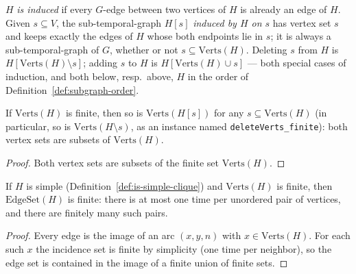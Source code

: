 \begin{definition}
  \label{def:subgraph-induce-delete-add}
  \leanok
  $H$ \emph{is induced} if every $G$-edge between two vertices of $H$ is
  already an edge of $H$. Given $s \subseteq V$, the sub-temporal-graph
  $H[s]$ \emph{induced by $H$ on $s$} has vertex set $s$ and keeps exactly
  the edges of $H$ whose both endpoints lie in $s$; it is always a
  sub-temporal-graph of $G$, whether or not $s \subseteq \mathrm{Verts}(H)$.
  Deleting $s$ from $H$ is $H[\mathrm{Verts}(H) \setminus s]$; adding $s$ to
  $H$ is $H[\mathrm{Verts}(H) \cup s]$ — both special cases of induction,
  and both below, resp.\ above, $H$ in the order of
  Definition~\ref{def:subgraph-order}.
\end{definition}

\begin{lemma}
  \label{lem:subgraph-finite-induce-delete}
  \leanok
  If $\mathrm{Verts}(H)$ is finite, then so is $\mathrm{Verts}(H[s])$ for
  any $s \subseteq \mathrm{Verts}(H)$ (in particular, so is
  $\mathrm{Verts}(H \setminus s)$, as an instance named
  \texttt{deleteVerts\_finite}): both vertex sets are subsets of
  $\mathrm{Verts}(H)$.
\end{lemma}

\begin{proof}
  \leanok
  Both vertex sets are subsets of the finite set $\mathrm{Verts}(H)$.
\end{proof}

\begin{lemma}
  \label{lem:subgraph-finite-edgeSet-of-simple}
  \leanok
  If $H$ is simple (Definition~\ref{def:is-simple-clique}) and
  $\mathrm{Verts}(H)$ is finite, then $\mathrm{EdgeSet}(H)$ is finite: there is
  at most one time per unordered pair of vertices, and there are finitely
  many such pairs.
\end{lemma}

\begin{proof}
  \leanok
  Every edge is the image of an arc $(x,y,n)$ with $x \in \mathrm{Verts}(H)$. For each such $x$ the incidence set is finite by simplicity (one time per neighbor), so the edge set is contained in the image of a finite union of finite sets.
\end{proof}


